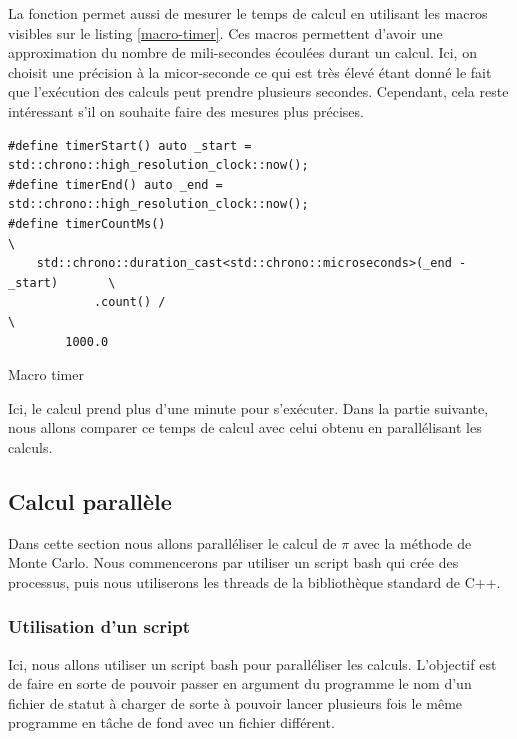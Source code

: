\documentclass[a4paper]{article}
\begin{document}
La fonction permet aussi de mesurer le temps de calcul en utilisant les macros
visibles sur le listing \ref{macro-timer}. Ces macros permettent d'avoir une
approximation du nombre de mili-secondes écoulées durant un calcul. Ici, on
choisit une précision à la micor-seconde ce qui est très élevé étant donné le
fait que l'exécution des calculs peut prendre plusieurs secondes. Cependant,
cela reste intéressant s'il on souhaite faire des mesures plus précises.

\begin{listing}[ht!]
\begin{verbatim}
#define timerStart() auto _start = std::chrono::high_resolution_clock::now();
#define timerEnd() auto _end = std::chrono::high_resolution_clock::now();
#define timerCountMs()                                                         \
    std::chrono::duration_cast<std::chrono::microseconds>(_end - _start)       \
            .count() /                                                         \
        1000.0
\end{verbatim}
\caption{Macro timer}
\label{macro-timer}
\end{listing}

Ici, le calcul prend plus d'une minute pour s'exécuter. Dans la partie suivante,
nous allons comparer ce temps de calcul avec celui obtenu en parallélisant les
calculs.

\subsection{Calcul parallèle}

Dans cette section nous allons paralléliser le calcul de $\pi$ avec la méthode
de Monte Carlo. Nous commencerons par utiliser un script bash qui crée des
processus, puis nous utiliserons les threads de la bibliothèque standard de C++.

\subsubsection{Utilisation d'un script}
\label{sec:script}

Ici, nous allons utiliser un script bash pour paralléliser les calculs.
L'objectif est de faire en sorte de pouvoir passer en argument du programme le
nom d'un fichier de statut à charger de sorte à pouvoir lancer plusieurs fois le
même programme en tâche de fond avec un fichier différent.\\
\end{document}
